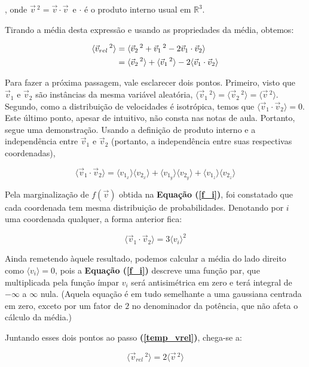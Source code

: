 \documentclass[12pt]{extarticle} %
\begin{document}
, onde $\vec{v}\,^2 = \vec{v}\cdot\vec{v}\,$ e $\cdot$ é o produto interno usual em $\mathbb{R}^3$.

Tirando a média desta expressão e usando as propriedades da média, obtemos:

\begin{align}
\langle \vec{v}_{rel}\,^2 \rangle &= \langle \vec{v}_2\,^2+\vec{v}_1\,^2 - 2\vec{v}_1\cdot\vec{v}_2\rangle \notag \\
&=\langle\vec{v}_2\,^2\rangle+\langle\vec{v}_1\,^2\rangle-2\langle\vec{v}_1\cdot\vec{v}_2\rangle
\label{temp_vrel}
\end{align}

Para fazer a próxima passagem, vale esclarecer dois pontos. Primeiro, visto que $\vec{v}_1$ e $\vec{v}_2$ são instâncias da mesma variável aleatória, $\langle\vec{v}_1\,^2\rangle = \langle\vec{v}_2\,^2\rangle =\langle\vec{v}\,^2\rangle$. Segundo, como a distribuição de velocidades é isotrópica, temos que $\langle \vec{v}_1\cdot\vec{v}_2\rangle = 0$. Este último ponto, apesar de intuitivo, não consta nas notas de aula. Portanto, segue uma demonstração. Usando a definição de produto interno e a independência entre $\vec{v}_1$ e $\vec{v}_2$ (portanto, a independência entre suas respectivas coordenadas),

$$\langle\vec{v}_1\cdot\vec{v}_2\rangle = 
    \langle v_{1_x}\rangle \langle v_{2_x}\rangle + 
    \langle v_{1_y} \rangle \langle v_{2_y}\rangle + \langle v_{1_z} \rangle\langle v_{2_z}\rangle$$

Pela marginalização de $f(\vec{v})$ obtida na \textbf{Equação (\ref{f_i})}, foi constatado que cada coordenada tem mesma distribuição de probabilidades. Denotando por $i$ uma coordenada qualquer, a forma anterior fica:

$$\langle\vec{v}_1\cdot\vec{v}_2\rangle = 3\langle v_i\rangle ^2$$

Ainda remetendo àquele resultado, podemos calcular a média do lado direito como $\langle v_i \rangle = 0$, pois a \textbf{Equação (\ref{f_i})} descreve uma função par, que multiplicada pela função ímpar $v_i$ será antisimétrica em zero e terá integral de $-\infty$ a $\infty$ nula. (Aquela equação é em tudo semelhante a uma gaussiana centrada em zero, exceto por um fator de $2$ no denominador da potência, que não afeta o cálculo da média.)

Juntando esses dois pontos ao passo \textbf{(\ref{temp_vrel})}, chega-se a:

\begin{equation}
    \langle \vec{v}_{rel}\,^2 \rangle = 2 \langle\vec{v}\,^2\rangle
\label{temp_meds}
\end{equation}
\end{document}
